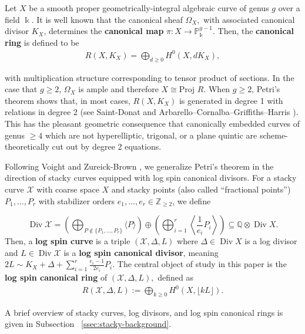 \documentclass{amsart}
\theoremstyle{plain}
\theoremstyle{definition}
\theoremstyle{remark}
\numberwithin{equation}{section}
\newcommand\BQ{{\mathbb Q}}
\newcommand\BP{{\mathbb P}}
\newcommand\BZ{{\mathbb Z}}
\newcommand\Bk{{\Bbbk}}
\newcommand\proj{\text{Proj }}
\DeclareMathOperator\di{Div}
\newcommand\sx{\mathscr X}
\newcommand \subhalf[1]{\frac{{#1} - 1}{2{#1}}}
\newcommand{\halfcan}{L}
\begin{document}
Let $X$ be a smooth proper geometrically-integral algebraic curve of genus $g$ over a field $\Bk$.
It is well known that the canonical sheaf $\Omega _X,$ with
associated canonical divisor $K_X$, determines the {\bf canonical
map } $\pi: X \rightarrow \BP_\Bk^{g - 1}$. Then, the {\bf canonical
ring} is defined to be
\begin{align*}
	R(X, K_X) = \bigoplus_{d \geq 0} H^0(X, dK_X),
\end{align*}

\noindent
with multiplication structure corresponding to tensor product of
sections. In the case that $g \geq 2$, $\Omega_X$ is ample and
therefore $X \cong \proj R$. When $g \geq 2$, Petri's theorem 
shows that, in most cases, $R(X, K_X)$
is generated in degree 1 with relations in degree 2 (see
Saint-Donat \cite[p. 157]{saint-donat:proj} and Arbarello--Cornalba--Griffiths--Harris
\cite[Section 3.3]{acgh:algebraic-curves}). This has the pleasant 
geometric consequence that canonically embedded curves of genus $\geq 4$ which are not hyperelliptic, trigonal, or a plane quintic are scheme-theoretically cut out by degree 2 equations.

Following Voight and Zureick-Brown \cite{vzb:stacky}, we generalize 
Petri's theorem in the direction of stacky curves equipped with
log spin canonical divisors. For a stacky curve $\sx$ with coarse space $X$ and
stacky points (also called ``fractional points'') $P_1, \ldots, P_r$
with stabilizer orders $e_1, \ldots, e_r \in \BZ_{\geq 2}$, we define

\[
	\di \sx = \left(\bigoplus_{P\notin \{P_1, \ldots, P_r\}} \langle 
	P \rangle \right) \oplus \left(\bigoplus_{i = 1}^r \left \langle 
	\frac{1}{e_i}P_i \right \rangle \right) \subseteq \BQ \otimes \di X.
\]
Then, a {\bf log spin curve} is a triple $(\sx, \Delta, \halfcan)$
where $\Delta \in \di X$ is a log divisor and $L \in \di \sx$ is a {\bf log spin canonical divisor}, meaning $2\halfcan \sim K_X +
\Delta + \sum_{i = 1}^{r} \subhalf{e_i} P_i$. The central object of
study in this paper is the {\bf log spin canonical ring} of $(\sx,
\Delta, \halfcan),$ defined as
\begin{align*}
	R(\sx, \Delta, \halfcan) := \bigoplus_{k \geq 0} H^0(X, \lfloor k \halfcan \rfloor).
\end{align*}

\noindent
A brief overview of stacky curves, log divisors, and log spin
canonical rings is given in Subsection
~\ref{ssec:stacky-background}.
\end{document}
